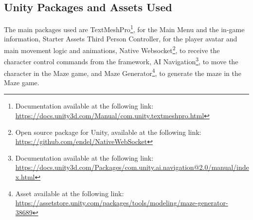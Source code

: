 \subsection*{Unity Packages and Assets Used}
The main packages used are TextMeshPro\footnote{Documentation available at the following link: \url{https://docs.unity3d.com/Manual/com.unity.textmeshpro.html}}, for the Main Menu and the in-game information, Starter Assets \textemdash Third Person Controller, for the player avatar and main movement logic and animations, Native Websocket\footnote{Open source package for Unity, available at the following link: \url{https://github.com/endel/NativeWebSocket}}, to receive the character control commands from the framework, AI Navigation\footnote{Documentation available at the following link: \url{https://docs.unity3d.com/Packages/com.unity.ai.navigation@2.0/manual/index.html}}, to move the character in the Maze game, and Maze Generator\footnote{Asset available at the following link: \url{https://assetstore.unity.com/packages/tools/modeling/maze-generator-38689}}, to generate the maze in the Maze game.



